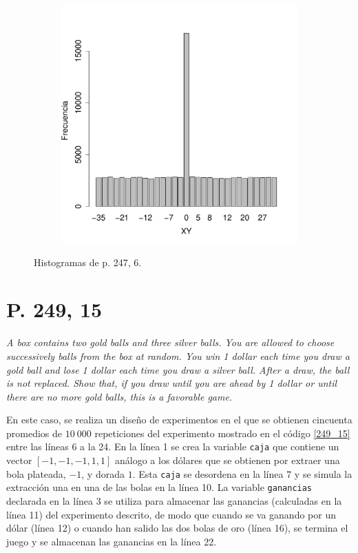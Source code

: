 \documentclass[paper=leter, fontsize=11pt]{scrartcl}
\begin{document}
\begin{figure}
\begin{subfigure}{0.5\textwidth}
        \label{247_6_Y}
    \end{subfigure}
    \begin{subfigure}{1\textwidth}
        \centering
        \includegraphics[scale=0.4]{247_6_XY.pdf}
        \label{247_6_XY}
    \end{subfigure}
    \caption{Histogramas de p. 247, 6.}
    \label{247_6_Fig}
\end{figure}

\section*{P. 249, 15}
\emph{A box contains two gold balls and three silver balls. You are allowed to choose successively balls from the box at random. You win 1 dollar each time you draw a gold ball and lose 1 dollar each time you draw a silver ball. After a draw, the ball is not replaced. Show that, if you draw until you are ahead by 1 dollar or until there are no more gold balls, this is a favorable game.}

En este caso, se realiza un diseño de experimentos en el que se obtienen cincuenta promedios de $10\ 000$ repeticiones del experimento mostrado en el código \ref{249_15} entre las líneas 6 a la 24. En la línea 1 se crea la variable \texttt{caja} que contiene un vector $[-1, -1, -1, 1, 1]$ análogo a los dólares que se obtienen por extraer una bola plateada, $-1$, y dorada $1$. Esta \texttt{caja} se desordena en la línea 7 y se simula la extracción una en una de las bolas en la línea 10. La variable \texttt{ganancias} declarada en la línea 3 se utiliza para almacenar las ganancias (calculadas en la línea 11) del experimento descrito, de modo que cuando se va ganando por un dólar (línea 12) o cuando han salido las dos bolas de oro (línea 16), se termina el juego y se almacenan las ganancias en la línea 22.
\end{document}
